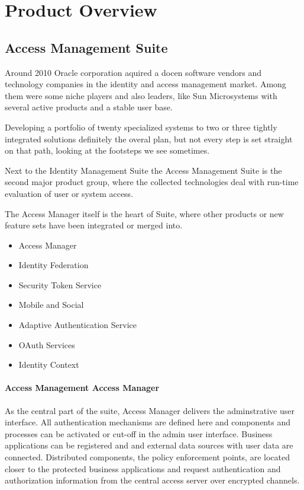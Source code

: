 
\chapter[Product Overview]{Product Overview}

\section{Access Management Suite}

Around 2010 Oracle corporation aquired a docen software vendors and technology companies in the identity and access management market. Among them were some niche players and also leaders, like Sun Microsystems with several active products and a stable user base.

Developing a portfolio of twenty specialized systems to two or three tightly integrated solutions definitely the overal plan, but not every step is set straight on that path, looking at the footsteps we see sometimes.

Next to the Identity Management Suite the Access Management Suite is the second major product group, where the collected technologies deal with run-time evaluation of user or system access.

The Access Manager itself is the heart of Suite, where other products or new feature sets have been integrated or merged into.

\begin{itemize}
    \item Access Manager
    \item Identity Federation
    \item Security Token Service
    \item Mobile and Social
    \item Adaptive Authentication Service
    \item OAuth Services
    \item Identity Context
\end{itemize}

\subsubsection{Access Management Access Manager}

As the central part of the suite, Access Manager delivers the adminstrative user interface. All authentication mechanisms are defined here and components and processes can be activated or cut-off in the admin user interface. Business applications can be registered and and external data sources with user data are connected.
Distributed components, the policy enforcement points, are located closer to the protected business applications and request authentication and authorization information from the central access server over encrypted channels.



